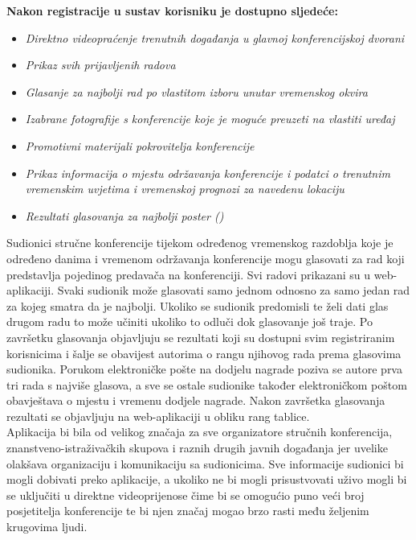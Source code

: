         \textbf{Nakon registracije u sustav korisniku je dostupno sljedeće:}
        \begin{itemize}
        	\item \textit{Direktno videopraćenje trenutnih događanja u glavnoj konferencijskoj dvorani}
        	\item \textit{Prikaz svih prijavljenih radova}
        	\item \textit{Glasanje za najbolji rad po vlastitom izboru unutar vremenskog okvira}
        	\item \textit{Izabrane fotografije s konferencije koje je moguće preuzeti na vlastiti uređaj}
        	\item \textit{Promotivni materijali pokrovitelja konferencije}
        	\item \textit{Prikaz informacija o mjestu održavanja konferencije i podatci o trenutnim vremenskim uvjetima i vremenskoj prognozi za navedenu lokaciju}
        	\item \textit{Rezultati glasovanja za najbolji poster ()}\\
        \end{itemize}

		Sudionici stručne konferencije tijekom određenog vremenskog razdoblja koje je određeno danima i vremenom održavanja konferencije mogu glasovati za rad koji predstavlja pojedinog predavača na konferenciji. Svi radovi prikazani su u web-aplikaciji. Svaki sudionik može glasovati samo jednom odnosno za samo jedan rad za kojeg smatra da je najbolji. Ukoliko se sudionik predomisli te želi dati glas drugom radu to može učiniti ukoliko to odluči dok glasovanje još traje. Po završetku glasovanja objavljuju se rezultati koji su dostupni svim registriranim korisnicima i šalje se obavijest autorima o rangu njihovog rada prema glasovima sudionika. Porukom elektroničke pošte na dodjelu nagrade poziva se autore prva tri rada s najviše glasova, a sve se ostale sudionike također elektroničkom poštom obavještava o mjestu i vremenu dodjele nagrade. Nakon završetka glasovanja rezultati se objavljuju na web-aplikaciji u obliku rang tablice.\\
		
		Aplikacija bi bila od velikog značaja za sve organizatore stručnih konferencija, znanstveno-istraživačkih skupova i raznih drugih javnih događanja jer uvelike olakšava organizaciju i komunikaciju sa sudionicima. Sve informacije sudionici bi mogli dobivati preko aplikacije, a ukoliko ne bi mogli prisustvovati uživo mogli bi se uključiti u direktne videoprijenose čime bi se omogućio puno veći broj posjetitelja konferencije te bi njen značaj mogao brzo rasti među željenim krugovima ljudi.\\
		
